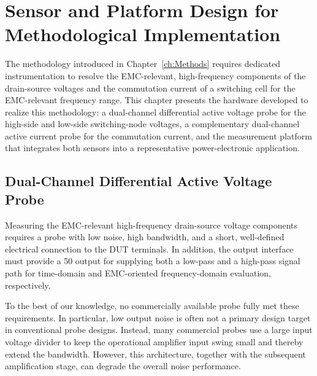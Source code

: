 
\chapter{Sensor and Platform Design for Methodological Implementation}

The methodology introduced in Chapter~\ref{ch:Methods} requires dedicated instrumentation to resolve the EMC-relevant, high-frequency components of the drain-source voltages and the commutation current of a switching cell for the EMC-relevant frequency range.
This chapter presents the hardware developed to realize this methodology: a dual-channel differential active voltage probe for the high-side and low-side switching-node voltages, a complementary dual-channel active current probe for the commutation current, and the measurement platform that integrates both sensors into a representative power-electronic application.

\section{Dual-Channel Differential Active Voltage Probe}
\label{ch:voltage}

Measuring the EMC-relevant high-frequency drain-source voltage components requires a probe with low noise, high bandwidth, and a short, well-defined electrical connection to the DUT terminals.
In addition, the output interface must provide a \SI{50}{\Omega} output for supplying both a low-pass and a high-pass signal path for time-domain and EMC-oriented frequency-domain evaluation, respectively.

To the best of our knowledge, no commercially available probe fully met these requirements. 
In particular, low output noise is often not a primary design target in conventional probe designs. 
Instead, many commercial probes use a large input voltage divider to keep the operational amplifier input swing small and thereby extend the bandwidth. 
However, this architecture, together with the subsequent amplification stage, can degrade the overall noise performance.











